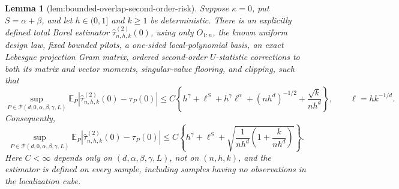 \documentclass{article}
\newtheorem{lemma}{Lemma}
\begin{document}
\begin{lemma}[lem:bounded-overlap-second-order-risk]\label{lem:bounded-overlap-second-order-risk}
Suppose \(\kappa=0\), put \(S=\alpha+\beta\), and let \(h\in(0,1]\) and \(k\geq1\) be deterministic.  There is an explicitly defined total Borel estimator \(\widehat\tau^{(2)}_{n,h,k}(0)\), using only \(O_{1:n}\), the known uniform design law, fixed bounded pilots, a one-sided local-polynomial basis, an exact Lebesgue projection Gram matrix, ordered second-order \(U\)-statistic corrections to both its matrix and vector moments, singular-value flooring, and clipping, such that
\[
 \sup_{P\in\mathcal P(d,0,\alpha,\beta,\gamma,L)}
 \mathbb E_P\left|\widehat\tau^{(2)}_{n,h,k}(0)-\tau_P(0)\right|
 \leq C\left\{
 h^\gamma+\ell^S+h^\gamma\ell^\alpha
 +(nh^d)^{-1/2}+\frac{\sqrt{k}}{nh^d}
 \right\},
 \qquad \ell=hk^{-1/d}.
\]
Consequently,
\[
 \sup_{P\in\mathcal P(d,0,\alpha,\beta,\gamma,L)}
 \mathbb E_P\left|\widehat\tau^{(2)}_{n,h,k}(0)-\tau_P(0)\right|
 \leq C\left\{
 h^\gamma+\ell^S+
 \sqrt{\frac{1}{nh^d}\left(1+\frac{k}{nh^d}\right)}
 \right\}.
\]
Here \(C<\infty\) depends only on \((d,\alpha,\beta,\gamma,L)\), not on \((n,h,k)\), and the estimator is defined on every sample, including samples having no observations in the localization cube.
\end{lemma}
\end{document}
